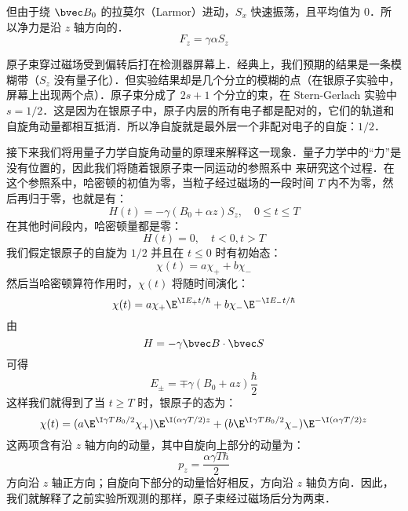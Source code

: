 但由于绕 $\bvec B_0$ 的拉莫尔（Larmor）进动，$S_x$ 快速振荡，且平均值为 $0$．所以净力是沿 $z$ 轴方向的．
\begin{equation}
F_z=\gamma\alpha S_z
\end{equation}

原子束穿过磁场受到偏转后打在检测器屏幕上．经典上，我们预期的结果是一条模糊带（$S_z$ 没有量子化）．但实验结果却是几个分立的模糊的点（在银原子实验中，屏幕上出现两个点）．原子束分成了 $2s+1$ 个分立的束，在 Stern-Gerlach 实验中 $s=1/2$．这是因为在银原子中，原子内层的所有电子都是配对的，它们的轨道和自旋角动量都相互抵消．所以净自旋就是最外层一个非配对电子的自旋：$1/2$．

接下来我们将用量子力学自旋角动量的原理来解释这一现象．量子力学中的“力”是没有位置的，因此我们将随着银原子束一同运动的参照系中
来研究这个过程．在这个参照系中，哈密顿的初值为零，当粒子经过磁场的一段时间 $T$ 内不为零，然后再归于零，也就是有：
\begin{equation}
H(t)=-\gamma(B_0+\alpha z)S_z, \quad 0\leq t\leq T
\end{equation}
在其他时间段内，哈密顿量都是零：
\begin{equation}
H(t)=0, \quad t<0,t>T
\end{equation}
我们假定银原子的自旋为 $1/2$ 并且在 $t\leq 0$ 时有初始态：
\begin{equation}
\chi(t)=a\chi_++b\chi_-
\end{equation}
然后当哈密顿算符作用时，$\chi(t)$ 将随时间演化：
\begin{equation}
\chi(t)=a\chi_+\E^{\I E_+ t/\hbar} + b\chi_-\E^{-\I E_- t/\hbar}
\end{equation}
由
\begin{equation}
H=-\gamma\bvec B\cdot \bvec S
\end{equation}
可得
\begin{equation}
E_\pm = \mp \gamma(B_0+az)\frac{\hbar}{2}
\end{equation}
这样我们就得到了当 $t\geq T$ 时，银原子的态为：
\begin{equation}
\chi(t)=(a\E^{\I\gamma TB_0/2}\chi_+)\E^{\I(\alpha\gamma T/2)z} + (b\E^{\I\gamma TB_0/2}\chi_-)\E^{-\I(\alpha\gamma T/2)z} 
\end{equation}
这两项含有沿 $ z $ 轴方向的动量，其中自旋向上部分的动量为：
\begin{equation}
p_z=\frac{\alpha\gamma T\hbar}{2}
\end{equation}
方向沿 $ z $ 轴正方向；自旋向下部分的动量恰好相反，方向沿 $ z $ 轴负方向．因此，我们就解释了之前实验所观测的那样，原子束经过磁场后分为两束．


